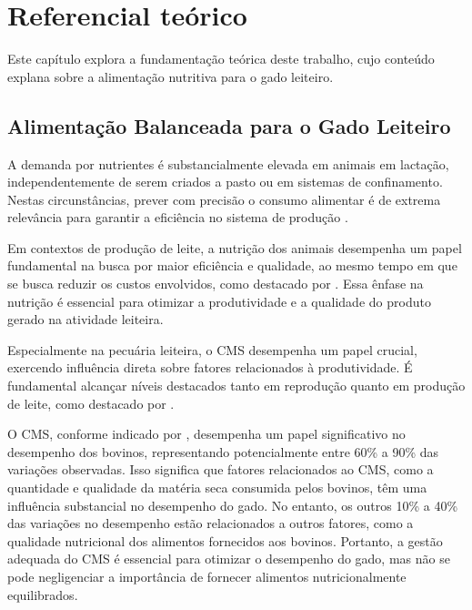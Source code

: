 \chapter{Referencial te\'orico}\label{cap:referencialTeorico}

Este capítulo explora a fundamentação teórica deste trabalho, cujo conteúdo explana sobre a alimentação nutritiva para o gado leiteiro.

\section{Alimentação Balanceada para o Gado Leiteiro}\label{sec:alimentacaoBalanceadaGadoLeiteiro}

A demanda por nutrientes é substancialmente elevada em animais em lactação, independentemente de serem criados a pasto ou em sistemas de confinamento. Nestas circunstâncias, prever com precisão o consumo alimentar é de extrema relevância para garantir a eficiência no sistema de produção \cite{Kolln:2014:AvaliacaoSistemaOtimizacaoRacaoVacaLeiteira}.

Em contextos de produção de leite, a nutrição dos animais desempenha um papel fundamental na busca por maior eficiência e qualidade, ao mesmo tempo em que se busca reduzir os custos envolvidos, como destacado por . Essa ênfase na nutrição é essencial para otimizar a produtividade e a qualidade do produto gerado na atividade leiteira.

Especialmente na pecuária leiteira, o \gls{CMS} desempenha um papel crucial, exercendo influência direta sobre fatores relacionados à produtividade. É fundamental alcançar níveis destacados tanto em reprodução quanto em produção de leite, como destacado por .

O \gls{CMS}, conforme indicado por , desempenha um papel significativo no desempenho dos bovinos, representando potencialmente entre 60\% a 90\% das variações observadas. Isso significa que fatores relacionados ao \gls{CMS}, como a quantidade e qualidade da matéria seca consumida pelos bovinos, têm uma influência substancial no desempenho do gado. No entanto, os outros 10\% a 40\% das variações no desempenho estão relacionados a outros fatores, como a qualidade nutricional dos alimentos fornecidos aos bovinos. Portanto, a gestão adequada do \gls{CMS} é essencial para otimizar o desempenho do gado, mas não se pode negligenciar a importância de fornecer alimentos nutricionalmente equilibrados.

